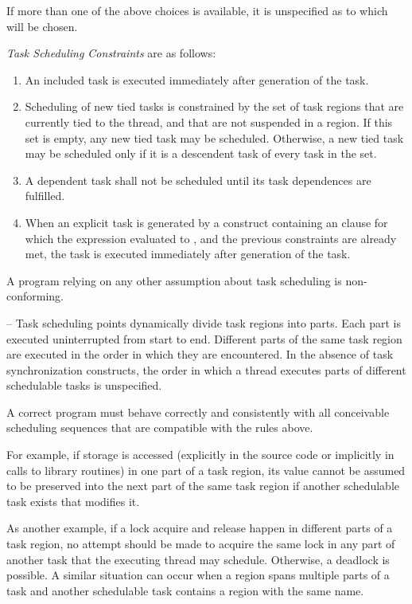 If more than one of the above choices is available, it is unspecified as to which will be 
chosen.

\emph{Task Scheduling Constraints} are as follows:

\begin{enumerate}
\item An included task is executed immediately after generation of the task.

\item Scheduling of new tied tasks is constrained by the set of task regions that are currently 
tied to the thread, and that are not suspended in a  region. If this set is empty, 
any new tied task may be scheduled. Otherwise, a new tied task may be scheduled only 
if it is a descendent task of every task in the set.

\item A dependent task shall not be scheduled until its task dependences are fulfilled.

\item When an explicit task is generated by a construct containing an  clause for which the 
expression evaluated to , and the previous constraints are already met, the task is 
executed immediately after generation of the task.
\end{enumerate}

A program relying on any other assumption about task scheduling is non-conforming.

\notestart
\noteheader – Task scheduling points dynamically divide task regions into parts. Each part is 
executed uninterrupted from start to end. Different parts of the same task region are 
executed in the order in which they are encountered. In the absence of task 
synchronization constructs, the order in which a thread executes parts of different 
schedulable tasks is unspecified.

A correct program must behave correctly and consistently with all conceivable 
scheduling sequences that are compatible with the rules above.

For example, if  storage is accessed (explicitly in the source code or 
implicitly in calls to library routines) in one part of a task region, its value cannot be 
assumed to be preserved into the next part of the same task region if another schedulable 
task exists that modifies it.

As another example, if a lock acquire and release happen in different parts of a task 
region, no attempt should be made to acquire the same lock in any part of another task 
that the executing thread may schedule. Otherwise, a deadlock is possible. A similar 
situation can occur when a  region spans multiple parts of a task and another 
schedulable task contains a  region with the same name.


